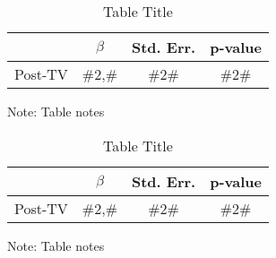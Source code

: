 \noindent 
\begin{table}[H]
\caption{Table Title\label{tab:regression}}
\medskip{}

\begin{centering}
\begin{tabular}{cccc}
\hline 
 & $\beta$ & Std. Err. & p-value\tabularnewline
\hline 
Post-TV & \#2,\# & \#2\# & \#2\#\tabularnewline
\hline 
\end{tabular}
\par\end{centering}
\begin{centering}
\medskip{}
\par\end{centering}
{\footnotesize{}Note: Table notes}{\footnotesize\par}
\end{table}

\noindent 
\begin{table}[H]
\caption{Table Title\label{tab:regression_post_1960}}
\medskip{}

\begin{centering}
\begin{tabular}{cccc}
\hline 
 & $\beta$ & Std. Err. & p-value\tabularnewline
\hline 
Post-TV & \#2,\# & \#2\# & \#2\#\tabularnewline
\hline 
\end{tabular}
\par\end{centering}
\begin{centering}
\medskip{}
\par\end{centering}
{\footnotesize{}Note: Table notes}{\footnotesize\par}
\end{table}